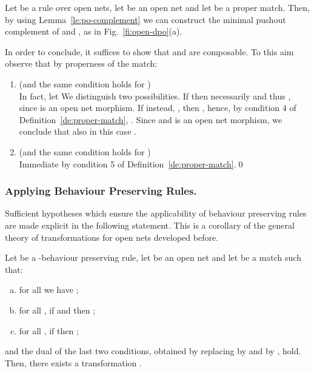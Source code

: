 \documentclass{LMCS}
\begin{document}
\proof
  Let  be a rule over open nets, let  be an open net and
  let  be a proper match.
Then, by using Lemma~\ref{le:po-complement} we can construct the minimal
  pushout complement of  and , as in Fig.~\ref{fi:open-dpo}(a).
  
  In order to conclude, it suffices to show that  and  are
  composable. To this aim observe that by properness of the match:

  \begin{enumerate}[]
    
  \item
     (and the same condition holds for )\\
    In fact, let  We distinguish two
    possibilities. If  then necessarily  and thus , since  is an open net
    morphism. If instead, , then , hence, by condition 4 of
    Definition~\ref{de:proper-match}, . Since
     and  is an open net morphism, we conclude
    that also in this case .

  \item
     (and the same condition holds for )\\
    Immediate by condition 5 of Definition~\ref{de:proper-match}.\qed
  \end{enumerate}

\subsubsection{Applying Behaviour Preserving Rules.}

Sufficient hypotheses which ensure the applicability of behaviour
preserving rules are made explicit in the following statement. This is
a corollary of the general theory of transformations for open nets
developed before.  



\begin{cor}
  \label{co:proper}
  Let  be a -behaviour preserving rule, let  be an
  open net and let  be a match such that:
  \begin{enumerate}[a.]
    


  \item for all  we have ;
 
  \item for all , if  and  then ;

  \item for all , if  
    then ;


  \end{enumerate}
  and the dual of the last two conditions, obtained by replacing 
   by  and  by , hold.
Then, there exists a transformation .
\end{cor}
\end{document}
